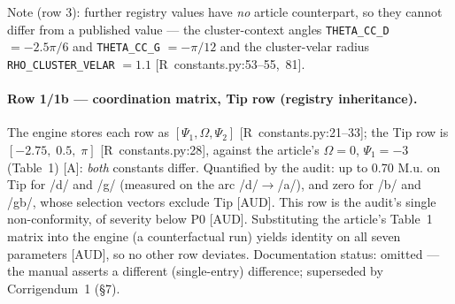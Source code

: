 \documentclass[11pt,letterpaper]{article}
\newcommand{\code}[1]{\texttt{#1}}
\newcommand{\Mua}{M.u.}
\begin{document}
\begin{table}[htbp]
\begin{adjustbox}{max width=\textwidth,center}
\end{adjustbox}

\medskip
\begin{minipage}{\textwidth}
\scriptsize\raggedright
Note (row 3): further registry values have \emph{no} article counterpart, so
they cannot differ from a published value --- the cluster-context angles
\code{THETA\_CC\_D} $=-2.5\pi/6$ and \code{THETA\_CC\_G} $=-\pi/12$ and the
cluster-velar radius \code{RHO\_CLUSTER\_VELAR} $=1.1$
\hbox{[R constants.py:53--55, 81]}.
\end{minipage}
\end{table}

\paragraph{Row 1/1b --- coordination matrix, Tip row (registry inheritance).}
The engine stores each row as $[\Psi_1,\Omega,\Psi_2]$
\hbox{[R constants.py:21--33]}; the Tip row is $[-2.75,,\;\pi]$
\hbox{[R constants.py:28]}, against the article's $$, $\Psi_1=-3$
(Table~1) [A]: \emph{both} constants differ. Quantified by the audit: up to
0.70 \Mua{} on Tip for /d/ and /g/ (measured on the arc /d/$\to$/a/), and
zero for /b/ and /gb/, whose selection vectors exclude Tip \hbox{[AUD]}. This
row is the audit's single non-conformity, of severity below P0 \hbox{[AUD]}.
Substituting the article's Table~1 matrix into the engine (a counterfactual
run) yields identity on all seven parameters \hbox{[AUD]}, so no other row
deviates. Documentation status: omitted --- the manual asserts a different
(single-entry) difference; superseded by Corrigendum~1 (\S7).
\end{document}
